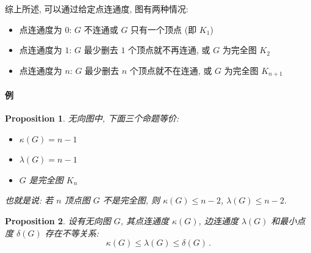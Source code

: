 \documentclass[UTF8]{ctexart}
\theoremstyle{mystyle}
\newtheorem{proposition}{Proposition}[section]
\theoremstyle{myremark}
\theoremstyle{plain}
\begin{document}
综上所述, 可以通过给定点连通度, 图有两种情况:
\begin{itemize}
    \item 点连通度为 $ 0 $: $ G $ 不连通或 $ G $ 只有一个顶点 (即 $ K_1 $)
    \item 点连通度为 $ 1 $: $ G $ 最少删去 $ 1 $ 个顶点就不再连通, 或 $ G $ 为完全图 $ K_2 $
    \item 点连通度为 $ n $: $ G $ 最少删去 $ n $ 个顶点就不在连通, 或 $ G $ 为完全图 $ K_{n + 1} $
\end{itemize}

\paragraph{例}



\begin{proposition}
    无向图中, 下面三个命题等价:
    \begin{itemize}
        \item $ \kappa(G) = n - 1 $
        \item $ \lambda(G) = n - 1 $
        \item $ G $ 是完全图 $ K_n $
    \end{itemize}
    也就是说: 若 $ n $ 顶点图 $ G $ 不是完全图, 则 $ \kappa(G) \leqslant n - 2 $, $ \lambda(G) \leqslant n - 2 $.
\end{proposition}

\begin{proposition}
    设有无向图 $ G $, 其点连通度 $ \kappa(G) $, 边连通度 $ \lambda(G) $ 和最小点度 $ \delta(G) $ 存在不等关系:
    \[ \kappa(G) \leqslant \lambda(G) \leqslant \delta(G) \,.\]
\end{proposition}
\end{document}
